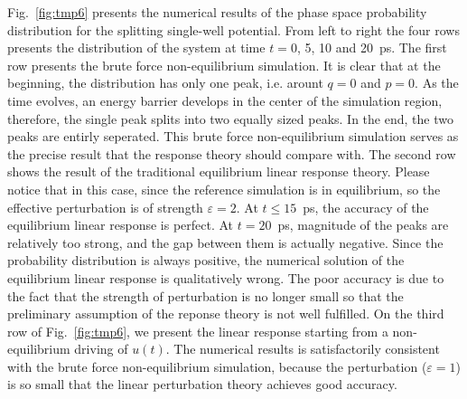 \documentclass[]{tMPH2e}
\newcommand{\eps}{\varepsilon}
\newcommand{\mt}{\mathcal T}
\begin{document}
Fig.~\ref{fig:tmp6} presents the numerical results of the phase space probability distribution for the splitting
single-well potential. From left to right the four rows presents the
distribution of the system at time $t = 0$, 5, 10 and 20~\textsf{ps}. The first
row presents the brute force non-equilibrium simulation.  It is clear
that at the beginning, the distribution has only one peak,
i.e. arount $q = 0$ and $p = 0$. As the time evolves, an energy barrier develops
in the center of the simulation region, therefore, the single peak
splits into two equally sized peaks.  In the end, the two
peaks are entirly seperated.  This brute force non-equilibrium
simulation serves as the precise result that the response theory
should compare with. The second row shows the result of the
traditional equilibrium linear response theory.  Please notice that in
this case, since the reference simulation is in equilibrium, so 
the effective perturbation is of strength $\eps = 2$.  At $t \leq
15$~\textsf{ps}, the accuracy of the equilibrium linear response is
perfect. At $t =
20$~\textsf{ps}, magnitude of the peaks are relatively too strong,
and the gap between them is actually negative.
Since the probability distribution is always positive, the
numerical solution of the equilibrium linear response is qualitatively wrong.
The poor accuracy is due to the fact that the strength of perturbation is no
longer small so that the preliminary assumption of the reponse theory
is not well fulfilled.  On the third row of Fig.~\ref{fig:tmp6},
we present the linear response starting from a non-equilibrium driving
of $u(t)$.  The numerical results is satisfactorily consistent with
the brute force non-equilibrium simulation, because the perturbation
($\eps = 1$) is so small that the linear perturbation theory achieves
good accuracy.

\end{document}
